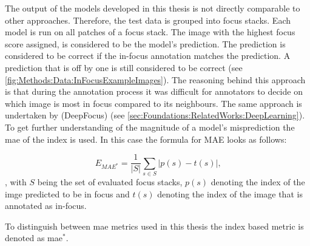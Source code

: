 



The output of the models developed in this thesis is not directly comparable to other approaches. Therefore, the test data is grouped into focus stacks. Each model is run on all patches of a focus stack. The image with the highest focus score assigned, is considered to be the model's prediction. The prediction is considered to be correct if the in-focus annotation matches the prediction. A prediction that is off by one is still considered to be correct (see \autoref{fig:Methods:Data:InFocusExampleImages}).
The reasoning behind this approach is that during the annotation process it was difficult for annotators to decide on which image is most in focus compared to its neighbours. The same approach is undertaken by \citeauthor{senaras2018deepfocus} (DeepFocus) \cite{senaras2018deepfocus} (see \autoref{sec:Foundations:RelatedWorks:DeepLearning}). To get further understanding of the magnitude of a model's misprediction the \ac{mae} of the index is used. In this case the formula for MAE looks as follows:

$$E_{MAE^*} = \frac{1}{|S|}\sum_{s \in S} |p(s) - t(s)| \text{,}$$, with $S$ being the set of evaluated focus stacks, $p(s)$ denoting the index of the imge predicted to be in focus and $t(s)$ denoting the index of the image that is annotated as in-focus.

To distinguish between \ac{mae} metrics used in this thesis the index based metric is denoted as \ac{mae}$^*$.

